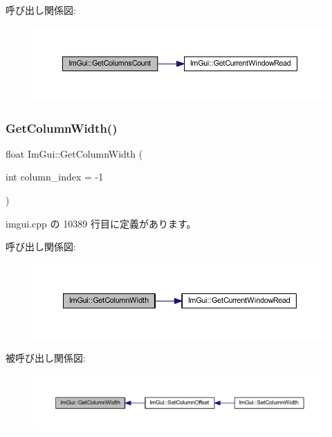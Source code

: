 呼び出し関係図\+:\nopagebreak
\begin{figure}[H]
\begin{center}
\leavevmode
\includegraphics[width=350pt]{namespace_im_gui_a3c2998ad9527948a4e4166c4f7db9ec9_cgraph}
\end{center}
\end{figure}
\mbox{\label{namespace_im_gui_a3d205d86dab5ca0763a92997283ac36e}} 
\subsubsection{\texorpdfstring{Get\+Column\+Width()}{GetColumnWidth()}}
{\footnotesize\ttfamily float Im\+Gui\+::\+Get\+Column\+Width (\begin{DoxyParamCaption}\item[{int}]{column\+\_\+index = {\ttfamily -\/1} }\end{DoxyParamCaption})}



 imgui.\+cpp の 10389 行目に定義があります。

呼び出し関係図\+:\nopagebreak
\begin{figure}[H]
\begin{center}
\leavevmode
\includegraphics[width=350pt]{namespace_im_gui_a3d205d86dab5ca0763a92997283ac36e_cgraph}
\end{center}
\end{figure}
被呼び出し関係図\+:\nopagebreak
\begin{figure}[H]
\begin{center}
\leavevmode
\includegraphics[width=350pt]{namespace_im_gui_a3d205d86dab5ca0763a92997283ac36e_icgraph}
\end{center}
\end{figure}
\mbox{\label{namespace_im_gui_a410c8e19b2fea8b52746ca11b3930301}} 
